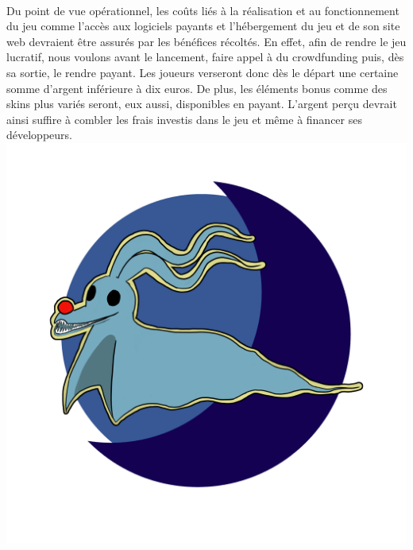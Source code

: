 \documentclass[12pt,a4paper]{article}
\begin{document}
\paragraph{}
Du point de vue opérationnel, les coûts liés à la réalisation et au fonctionnement du jeu comme l’accès aux logiciels payants et l’hébergement du jeu et de son site web devraient être assurés par les bénéfices récoltés. En effet, afin de rendre le jeu lucratif, nous voulons avant le lancement, faire appel à du crowdfunding puis, dès sa sortie, le rendre payant. Les joueurs verseront donc dès le départ une certaine somme d’argent inférieure à dix euros. De plus, les éléments bonus comme des skins plus variés seront, eux aussi, disponibles en payant. L’argent perçu devrait ainsi suffire à combler les frais investis dans le jeu et même à financer ses développeurs.
\newpage
    \vspace*{\fill}
    \hspace*{\fill} 
    \\
    \includegraphics[width = 15cm]{Image/final-logo.png}
    \\
    \hspace*{\fill}
    \vspace*{\fill}
     \\
\end{document}
